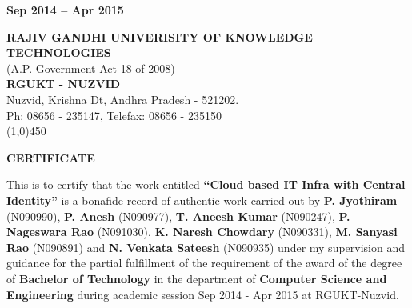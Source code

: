 \documentclass[12pt]{report}
\begin{document}
\begin{titlepage}
\begin{center}
\normalsize
\vfill
%
%

\textbf{Sep 2014 -- Apr 2015 }

\end{center}
\end{titlepage}


  
\thispagestyle{empty}


\begin{center}
  \textbf{RAJIV GANDHI UNIVERISITY OF KNOWLEDGE TECHNOLOGIES}  \\
 	(A.P. Government Act 18 of 2008) \\
 	\textbf{RGUKT - NUZVID} \\
 	Nuzvid, Krishna Dt, Andhra Pradesh - 521202. \\
 	Ph: 08656 - 235147, Telefax: 08656 - 235150 \\
 	\line(1,0){450}
\end{center}


\begin{center}

\Large
\textbf{CERTIFICATE} \\
\end{center}
\normalsize
\hspace{0.5cm} This is to certify that the work entitled \textbf{``Cloud based IT Infra with Central Identity''} is a bonafide record of authentic work carried out by \textbf{P. Jyothiram} (N090990), \textbf{P. Anesh} (N090977), \textbf{T. Aneesh Kumar} (N090247), \textbf{P. Nageswara Rao} (N091030), \textbf{K. Naresh Chowdary} (N090331), \textbf{M. Sanyasi Rao} (N090891) and  \textbf{N. Venkata Sateesh} (N090935)  under my supervision and guidance for the partial fulfillment of the requirement of the award of the degree of \textbf{Bachelor of Technology} in the department of \textbf{Computer Science and Engineering} during academic session Sep 2014 - Apr 2015 at RGUKT-Nuzvid. \newline
\end{document}
